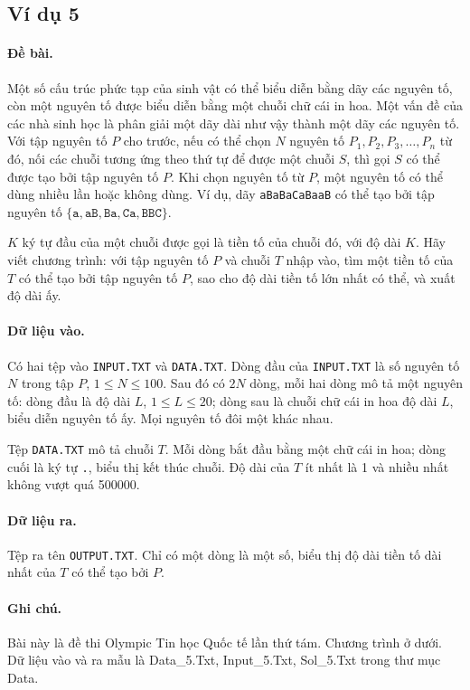 \documentclass[11pt]{article}
\begin{document}
\subsection{Ví dụ 5}

\paragraph{Đề bài.}
Một số cấu trúc phức tạp của sinh vật có thể biểu diễn bằng dãy các nguyên
tố, còn một nguyên tố được biểu diễn bằng một chuỗi chữ cái in hoa. Một vấn
đề của các nhà sinh học là phân giải một dãy dài như vậy thành một dãy các
nguyên tố. Với tập nguyên tố \(P\) cho trước, nếu có thể chọn \(N\) nguyên tố
\(P_1,P_2,P_3,\ldots,P_n\) từ đó, nối các chuỗi tương ứng theo thứ tự để được
một chuỗi \(S\), thì gọi \(S\) có thể được tạo bởi tập nguyên tố \(P\). Khi
chọn nguyên tố từ \(P\), một nguyên tố có thể dùng nhiều lần hoặc không dùng.
Ví dụ, dãy \texttt{aBaBaCaBaaB} có thể tạo bởi tập nguyên tố
\(\{\texttt{a},\texttt{aB},\texttt{Ba},\texttt{Ca},\texttt{BBC}\}\).

\(K\) ký tự đầu của một chuỗi được gọi là tiền tố của chuỗi đó, với độ dài
\(K\). Hãy viết chương trình: với tập nguyên tố \(P\) và chuỗi \(T\) nhập
vào, tìm một tiền tố của \(T\) có thể tạo bởi tập nguyên tố \(P\), sao cho độ
dài tiền tố lớn nhất có thể, và xuất độ dài ấy.

\paragraph{Dữ liệu vào.}
Có hai tệp vào \texttt{INPUT.TXT} và \texttt{DATA.TXT}. Dòng đầu của
\texttt{INPUT.TXT} là số nguyên tố \(N\) trong tập \(P\),
\(1\le N\le 100\). Sau đó có \(2N\) dòng, mỗi hai dòng mô tả một nguyên tố:
dòng đầu là độ dài \(L\), \(1\le L\le 20\); dòng sau là chuỗi chữ cái in hoa
độ dài \(L\), biểu diễn nguyên tố ấy. Mọi nguyên tố đôi một khác nhau.

Tệp \texttt{DATA.TXT} mô tả chuỗi \(T\). Mỗi dòng bắt đầu bằng một chữ cái in
hoa; dòng cuối là ký tự \texttt{.}, biểu thị kết thúc chuỗi. Độ dài của \(T\)
ít nhất là 1 và nhiều nhất không vượt quá 500000.

\paragraph{Dữ liệu ra.}
Tệp ra tên \texttt{OUTPUT.TXT}. Chỉ có một dòng là một số, biểu thị độ dài
tiền tố dài nhất của \(T\) có thể tạo bởi \(P\).

\paragraph{Ghi chú.}
Bài này là đề thi Olympic Tin học Quốc tế lần thứ tám. Chương trình ở dưới.
Dữ liệu vào và ra mẫu là Data\_5.Txt, Input\_5.Txt, Sol\_5.Txt trong thư mục
Data.
\end{document}
